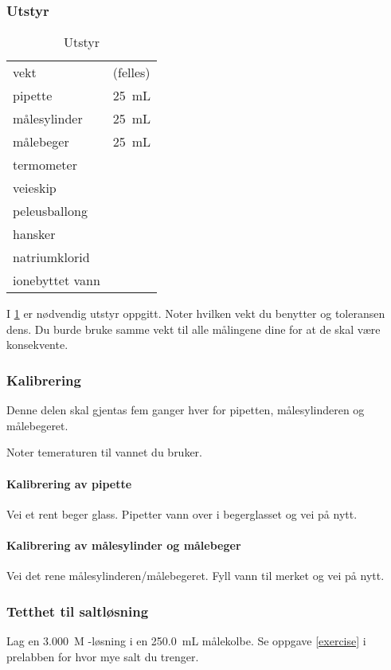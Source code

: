 \documentclass[hidelinks,12pt,norsk,a4paper,fleqn]{scrartcl}
\begin{document}
	\subsubsection{Utstyr}
	
	\begin{table}[H]
		\caption{Utstyr}
		\begin{tabular}{ll}
			\toprule
			vekt & (felles) \\
			pipette & \SI{25}{mL} \\
			målesylinder & \SI{25}{mL} \\
			målebeger & \SI{25}{mL} \\
			termometer & \\
			veieskip & \\
			peleusballong & \\
			hansker & \\
			natriumklorid & \\
			ionebyttet vann & \\ \bottomrule 
		\end{tabular}
		\label{equipment}
	\end{table}
	
	I \cref{equipment} er nødvendig utstyr oppgitt.	Noter hvilken vekt du benytter og toleransen dens. Du burde bruke samme vekt til alle målingene dine for at de skal være konsekvente.
	
	\subsubsection{Kalibrering}
	
	Denne delen skal gjentas fem ganger hver for pipetten, målesylinderen og målebegeret. 
	
	Noter temeraturen til vannet du bruker. 
	
	\paragraph{Kalibrering av pipette}
	Vei et rent beger glass. Pipetter vann over i begerglasset og vei på nytt.
	
	\paragraph{Kalibrering av målesylinder og målebeger}
	Vei det rene målesylinderen/målebegeret. Fyll vann til merket og vei på nytt.
	
	\subsubsection{Tetthet til saltløsning}
	Lag en \SI{3.000}{M} -løsning i en \SI{250.0}{mL} målekolbe. Se oppgave \ref{exercise} i prelabben for hvor mye salt du trenger. 
	
\end{document}

